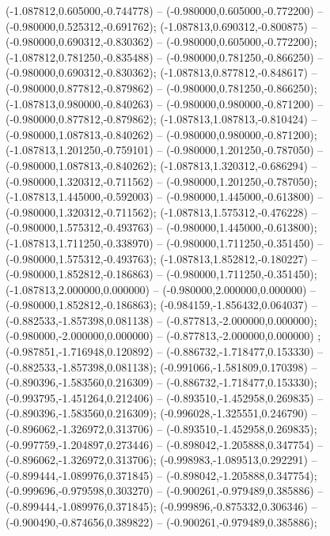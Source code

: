  (-1.087812,0.605000,-0.744778) -- (-0.980000,0.605000,-0.772200) -- (-0.980000,0.525312,-0.691762);
 (-1.087813,0.690312,-0.800875) -- (-0.980000,0.690312,-0.830362) -- (-0.980000,0.605000,-0.772200);
 (-1.087812,0.781250,-0.835488) -- (-0.980000,0.781250,-0.866250) -- (-0.980000,0.690312,-0.830362);
 (-1.087813,0.877812,-0.848617) -- (-0.980000,0.877812,-0.879862) -- (-0.980000,0.781250,-0.866250);
 (-1.087813,0.980000,-0.840263) -- (-0.980000,0.980000,-0.871200) -- (-0.980000,0.877812,-0.879862);
 (-1.087813,1.087813,-0.810424) -- (-0.980000,1.087813,-0.840262) -- (-0.980000,0.980000,-0.871200);
 (-1.087813,1.201250,-0.759101) -- (-0.980000,1.201250,-0.787050) -- (-0.980000,1.087813,-0.840262);
 (-1.087813,1.320312,-0.686294) -- (-0.980000,1.320312,-0.711562) -- (-0.980000,1.201250,-0.787050);
 (-1.087813,1.445000,-0.592003) -- (-0.980000,1.445000,-0.613800) -- (-0.980000,1.320312,-0.711562);
 (-1.087813,1.575312,-0.476228) -- (-0.980000,1.575312,-0.493763) -- (-0.980000,1.445000,-0.613800);
 (-1.087813,1.711250,-0.338970) -- (-0.980000,1.711250,-0.351450) -- (-0.980000,1.575312,-0.493763);
 (-1.087813,1.852812,-0.180227) -- (-0.980000,1.852812,-0.186863) -- (-0.980000,1.711250,-0.351450);
 (-1.087813,2.000000,0.000000) -- (-0.980000,2.000000,0.000000) -- (-0.980000,1.852812,-0.186863);
 (-0.984159,-1.856432,0.064037) -- (-0.882533,-1.857398,0.081138) -- (-0.877813,-2.000000,0.000000);
 (-0.980000,-2.000000,0.000000) -- (-0.877813,-2.000000,0.000000) ;
 (-0.987851,-1.716948,0.120892) -- (-0.886732,-1.718477,0.153330) -- (-0.882533,-1.857398,0.081138);
 (-0.991066,-1.581809,0.170398) -- (-0.890396,-1.583560,0.216309) -- (-0.886732,-1.718477,0.153330);
 (-0.993795,-1.451264,0.212406) -- (-0.893510,-1.452958,0.269835) -- (-0.890396,-1.583560,0.216309);
 (-0.996028,-1.325551,0.246790) -- (-0.896062,-1.326972,0.313706) -- (-0.893510,-1.452958,0.269835);
 (-0.997759,-1.204897,0.273446) -- (-0.898042,-1.205888,0.347754) -- (-0.896062,-1.326972,0.313706);
 (-0.998983,-1.089513,0.292291) -- (-0.899444,-1.089976,0.371845) -- (-0.898042,-1.205888,0.347754);
 (-0.999696,-0.979598,0.303270) -- (-0.900261,-0.979489,0.385886) -- (-0.899444,-1.089976,0.371845);
 (-0.999896,-0.875332,0.306346) -- (-0.900490,-0.874656,0.389822) -- (-0.900261,-0.979489,0.385886);
